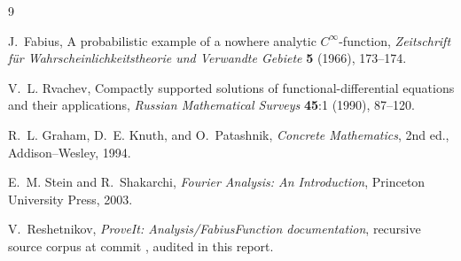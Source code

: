 \documentclass[11pt]{article}
\theoremstyle{definition}
\theoremstyle{remark}
\begin{document}
\begin{thebibliography}{9}

J.~Fabius,
\newblock A probabilistic example of a nowhere analytic $C^\infty$-function,
\newblock \emph{Zeitschrift f\"ur Wahrscheinlichkeitstheorie und Verwandte
Gebiete} \textbf{5} (1966), 173--174.

V.~L. Rvachev,
\newblock Compactly supported solutions of functional-differential equations
and their applications,
\newblock \emph{Russian Mathematical Surveys} \textbf{45}:1 (1990), 87--120.

R.~L. Graham, D.~E. Knuth, and O.~Patashnik,
\newblock \emph{Concrete Mathematics}, 2nd ed.,
\newblock Addison--Wesley, 1994.

E.~M. Stein and R.~Shakarchi,
\newblock \emph{Fourier Analysis: An Introduction},
\newblock Princeton University Press, 2003.

V.~Reshetnikov,
\newblock \emph{ProveIt: Analysis/FabiusFunction documentation},
\newblock recursive source corpus at commit \CorpusCommit, audited in this
report.

\end{thebibliography}
\end{document}
